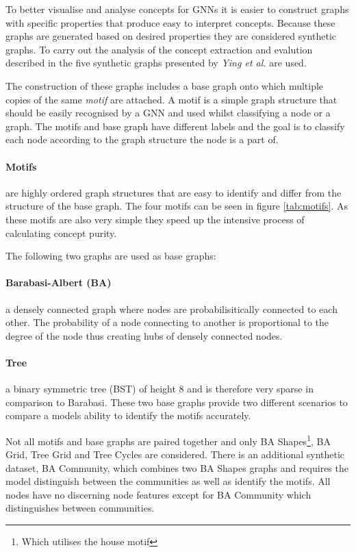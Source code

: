To better visualise and analyse concepts for GNNs it is easier to construct graphs with specific properties that produce easy to interpret concepts.
Because these graphs are generated based on desired properties they are considered synthetic graphs.
To carry out the analysis of the concept extraction and evalution described in  the five synthetic graphs presented by \textit{Ying et al.}\cite{ying2019gnnexplainer} are used.

The construction of these graphs includes a base graph onto which multiple copies of the same \emph{motif} are attached.
A motif is a simple graph structure that should be easily recognised by a GNN and used whilst classifying a node or a graph.
The motifs and base graph have different labels and the goal is to classify each node according to the graph structure the node is a part of.

\paragraph{Motifs}

are highly ordered graph structures that are easy to identify and differ from the structure of the base graph.
The four motifs can be seen in figure \ref{tab:motifs}.
As these motifs are also very simple they speed up the intensive process of calculating concept purity.

The following two graphs are used as base graphs:

\paragraph{Barabasi-Albert (BA)}
a densely connected graph where nodes are probabilisitically connected to each other.
The probability of a node connecting to another is proportional to the degree of the node thus creating hubs of densely connected nodes.

\paragraph{Tree}
a binary symmetric tree (BST) of height 8 and is therefore very sparse in comparison to Barabasi.
These two base graphs provide two different scenarios to compare a models ability to identify the motifs accurately.

Not all motifs and base graphs are paired together and only BA Shapes\footnote{Which utilises the house motif}, BA Grid, Tree Grid and Tree Cycles are considered.
There is an additional synthetic dataset, BA Community, which combines two BA Shapes graphs and requires the model distinguish between the communities as well as identify the motifs.
All nodes have no discerning node features except for BA Community which distinguishes between communities.

